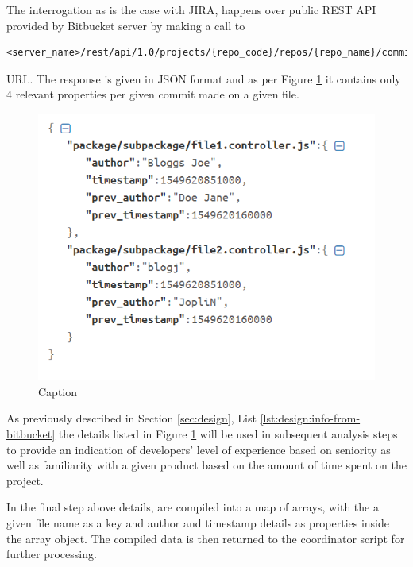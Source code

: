 The interrogation as is the case with JIRA, happens over public REST API provided by Bitbucket server by making a call to 
\begin{verbatim}
<server_name>/rest/api/1.0/projects/{repo_code}/repos/{repo_name}/commits/{commit_id}
\end{verbatim} 
URL.
The response is given in JSON format and as per Figure \ref{fig:source-code:bitbucket-prev-commit-response} it contains only 4 relevant properties per given commit made on a given file.

\begin{figure}[!h]
    \centering
    \includegraphics[scale=0.7]{Figures/gatherer/bitbucket_commit_details.PNG}
    \caption{Caption}
    \label{fig:source-code:bitbucket-prev-commit-response}
\end{figure}

As previously described in Section \ref{sec:design}, List \ref{lst:design:info-from-bitbucket} the details listed in Figure \ref{fig:source-code:bitbucket-prev-commit-response} will be used in subsequent analysis steps to provide an indication of developers' level of experience based on seniority as well as familiarity with a given product based on the amount of time spent on the project.
    
In the final step above details, are compiled into a map of arrays, with the a given file name as a key and author and timestamp details as properties inside the array object. The compiled data is then returned to the coordinator script for further processing.

